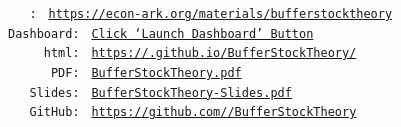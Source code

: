 \documentclass[BufferStockTheory]{subfiles}
\begin{document}
\begin{footnotesize}
  \parbox{0.9\textwidth}{
    \begin{center}
      \begin{tabbing}
        \texttt{~~~\REMARK:~} \= \= \texttt{\url{https://econ-ark.org/materials/bufferstocktheory}} \\ 
        \texttt{Dashboard:~} \> \> \texttt{\href{https://econ-ark.org/materials/bufferstocktheory}{Click `Launch Dashboard' Button}} \\
        \texttt{~~~~~html:~} \> \> \texttt{\href{https://\owner.github.io/BufferStockTheory/}{https://\owner.github.io/BufferStockTheory/}} \\ %
        \texttt{~~~~~~PDF:~} \> \> \texttt{\href{https://github.com/\owner/BufferStockTheory/blob/master/BufferStockTheory.pdf}{BufferStockTheory.pdf}} \\ 
        \texttt{~~~Slides:~} \> \> \texttt{\href{https://github.com/\owner/BufferStockTheory/blob/master/BufferStockTheory-Slides.pdf}{BufferStockTheory-Slides.pdf}} \\
        \texttt{~~~GitHub:~} \> \> \texttt{\href{https://github.com/\owner/BufferStockTheory}{https://github.com/\owner/BufferStockTheory}} \\
      \end{tabbing}
    \end{center}
  } %
\end{footnotesize}

\end{document}
